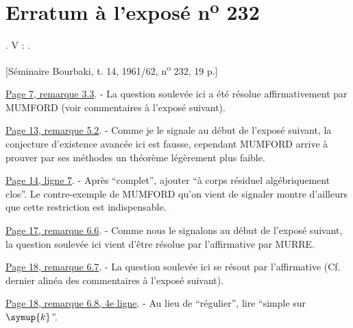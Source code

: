 \clearpage
\chapter*{Erratum à l'exposé n\textsuperscript{o} 232}

.  V : .

\begin{center}
[Séminaire Bourbaki, t. 14, 1961/62, n\textsuperscript{o} 232, 19 p.]
\end{center}

\noindent\uline{Page 7, remarque 3.3}. - La question soulevée ici a été
résolue affirmativement par MUMFORD (voir commentaires à l'exposé suivant).

\noindent\uline{Page 13, remarque 5.2}. - Comme je le signale au début de
l'exposé suivant, la conjecture d'existence avancée ici est fausse, cependant
MUMFORD arrive à prouver par ses méthodes un théorème légèrement plus faible.

\noindent\uline{Page 14, ligne 7}. - Après ``complet'', ajouter ``à corps
résiduel algébriquement clos''. Le contre-exemple de MUMFORD qu'on vient de
signaler montre d'ailleurs que cette restriction est indispensable.

\noindent\uline{Page 17, remarque 6.6}. - Comme nous le signalons au début
de l'exposé suivant, la question soulevée ici vient d'être résolue par
l'affirmative par MURRE.

\noindent\uline{Page 18, remarque 6.7}. - La question soulevée ici se résout
par l'affirmative (Cf. dernier alinéa des commentaires à l'exposé suivant).

\noindent\uline{Page 18, remarque 6.8, 4e ligne}. - Au lieu
de ``régulier'', lire ``simple sur $\symup{k}$''.

\par\smallskip
\begingroup\footnotesize
\endgroup
